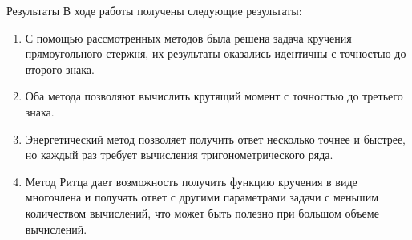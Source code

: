 \documentclass[ignoreonframetext,unicode]{beamer}
\begin{document}
\begin{frame}{Результаты}
	В ходе работы получены следующие результаты:
	\begin{block}{}
	\begin{enumerate}
		\item С помощью рассмотренных методов была решена задача кручения прямоугольного стержня, их результаты оказались идентичны с точностью до второго знака.	
		\item Оба метода позволяют вычислить крутящий момент с точностью до третьего знака.
		\item Энергетический метод позволяет получить ответ  несколько точнее и быстрее, но каждый раз требует вычисления тригонометрического ряда.
		\item 
		Метод Ритца дает возможность получить функцию кручения в виде многочлена и получать ответ с другими параметрами задачи с меньшим количеством вычислений, что может быть полезно при большом объеме вычислений.
	\end{enumerate}
	\end{block}	
\end{frame}	
\end{document}
